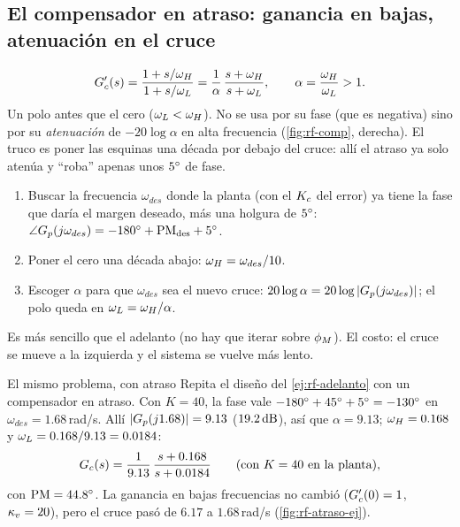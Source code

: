 \subsection{El compensador en atraso: ganancia en bajas, atenuación en el cruce}
\label{sec:rf-atraso}

\begin{equation}
  G_c'(s)=\frac{1+s/\omega_H}{1+s/\omega_L}=\frac{1}{\alpha}\,\frac{s+\omega_H}{s+\omega_L},\qquad
  \alpha=\frac{\omega_H}{\omega_L}>1 .
  \label{eq:rf-atraso}
\end{equation}
Un polo antes que el cero ($\omega_L<\omega_H$). No se usa por su fase (que es negativa) sino por su \emph{atenuación} de $-20\log\alpha$ en alta frecuencia (\cref{fig:rf-comp}, derecha). El truco es poner las esquinas una década por debajo del cruce: allí el atraso ya solo atenúa y ``roba'' apenas unos $5^{\circ}$ de fase.

\begin{receta}
\begin{enumerate}
  \item Buscar la frecuencia $\omega_{des}$ donde la planta (con el $K_c$ del error) ya tiene la fase que daría el margen deseado, más una holgura de $5^{\circ}$: $\angle G_p(j\omega_{des})=-180^{\circ}+\mathrm{PM}_{\mathrm{des}}+5^{\circ}$.
  \item Poner el cero una década abajo: $\omega_H=\omega_{des}/10$.
  \item Escoger $\alpha$ para que $\omega_{des}$ sea el nuevo cruce: $20\log\alpha=20\log|G_p(j\omega_{des})|$; el polo queda en $\omega_L=\omega_H/\alpha$.
\end{enumerate}
Es más sencillo que el adelanto (no hay que iterar sobre $\phi_M$). El costo: el cruce se mueve a la izquierda y el sistema se vuelve más lento.
\end{receta}

\begin{ejemplo}[label=ej:rf-atraso]{El mismo problema, con atraso}
Repita el diseño del \cref{ej:rf-adelanto} con un compensador en atraso.
\solucion Con $K=40$, la fase vale $-180^{\circ}+45^{\circ}+5^{\circ}=-130^{\circ}$ en $\omega_{des}=1.68$\,rad/s. Allí $|G_p(j1.68)|=9.13$ ($19.2\,\mathrm{dB}$), así que $\alpha=9.13$; $\omega_H=0.168$ y $\omega_L=0.168/9.13=0.0184$:
\[
  G_c(s)=\frac{1}{9.13}\,\frac{s+0.168}{s+0.0184}\qquad(\text{con } K=40 \text{ en la planta}),
\]
con $\mathrm{PM}=44.8^{\circ}$. La ganancia en bajas frecuencias no cambió ($G_c'(0)=1$, $\kappa_v=20$), pero el cruce pasó de $6.17$ a $1.68$\,rad/s (\cref{fig:rf-atraso-ej}).
\end{ejemplo}

